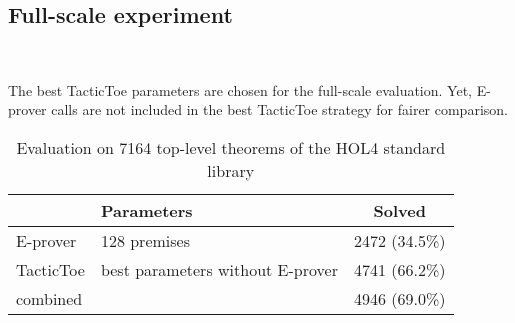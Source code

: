 \documentclass[runningheads,a4paper,draft]{svjour3}
\def\holfour{\textsf{HOL4}\xspace}
\def\eprover{\textsf{E-prover}\xspace}
\def\metis{\textsf{Metis}\xspace}
\def\tactictoe{\textsf{TacticToe}\xspace}
\newcommand{\ra}[1]{\renewcommand{\arraystretch}{#1}}
\begin{document}
%
%
%
%  
%


\subsection{Full-scale experiment}~\label{sec:full_exp} 


The best \tactictoe parameters are chosen for the full-scale evaluation. Yet,
\eprover calls are not included in the best \tactictoe strategy for fairer 
comparison.

\begin{table}[h!]
\centering\ra{1.3}
\small
\begin{tabular}{llc}
\toprule
  & Parameters & Solved \\
\midrule
   \eprover   & 128 premises & 2472 (34.5\%)\\ 
   \tactictoe & best parameters without \eprover & 4741 (66.2\%)\\
   combined   &              & 4946 (69.0\%)\\
\bottomrule
\end{tabular}
\caption{Evaluation on 7164 top-level theorems of the \holfour standard library 
\label{tab:_param}}
\end{table}
\end{document}
